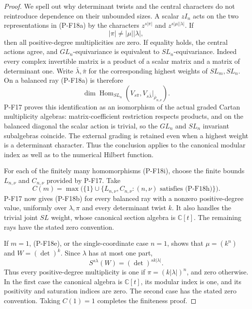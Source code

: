 \documentclass[11pt,a4paper]{article}
\begin{document}
\begin{proof}
We spell out why determinant twists and the central characters do
not reintroduce dependence on their unbounded sizes. A scalar
$zI_n$ acts on the two representations in (P-F18a) by the
characters $z^{s|\pi|}$ and $z^{s|\mu||\lambda|}$.
If
\[
 |\pi|\ne |\mu||\lambda|,
 \tag{P-F18j}
\]
then all positive-degree multiplicities are zero. If equality
holds, the central actions agree, and $GL_n$-equivariance is
equivalent to $SL_n$-equivariance. Indeed every complex invertible
matrix is a product of a scalar matrix and a matrix of determinant
one. Write $\bar\lambda,\bar\pi$ for the corresponding highest
weights of $SL_m,SL_n$. On a balanced ray (P-F18a) is therefore
\[
 \dim\operatorname{Hom}_{SL_n}
  \left(V_{s\bar\pi},
       V_{s\bar\lambda}|_{\overline\rho_{n,\nu}}\right).
 \tag{P-F18k}
\]
P-F17 proves this identification as an isomorphism of the actual
graded Cartan multiplicity algebras: matrix-coefficient restriction
respects products, and on the balanced diagonal the scalar action
is trivial, so the $GL_n$ and $SL_n$ invariant subalgebras coincide.
The external grading is retained even when a highest weight is a
determinant character. Thus the conclusion applies to the canonical
modular index as well as to the numerical Hilbert function.

For each of the finitely many homomorphisms (P-F18i), choose the
finite bounds $L_{n,\nu}$ and $C_{n,\nu}$ provided by P-F17.
Take
\[
 C(m)=\max\bigl(\{1\}\cup
       \{L_{n,\nu},C_{n,\nu}:(n,\nu)\text{ satisfies (P-F18h)}\}\bigr).
 \tag{P-F18l}
\]
P-F17 now gives (P-F18b) for every balanced ray with a nonzero
positive-degree value, uniformly over $\lambda,\pi$ and every
determinant twist $k$. It also handles the trivial joint $SL$
weight, whose canonical section algebra is $\mathbb C[t]$.
The remaining rays have the stated zero convention.

If $m=1$, (P-F18e), or the single-coordinate case $n=1$, shows
that $\mu=(k^n)$ and $W=(\det)^k$. Since $\lambda$ has at most
one part,
\[
 S^{s\lambda}(W)=(\det)^{sk|\lambda|}.
\]
Thus every positive-degree multiplicity is one if
$\pi=(k|\lambda|)^n$, and zero otherwise. In the first case the
canonical algebra is $\mathbb C[t]$, its modular index is one,
and its positivity and saturation indices are zero. The second
case has the stated zero convention. Taking $C(1)=1$ completes
the finiteness proof.


\end{proof}
\end{document}
